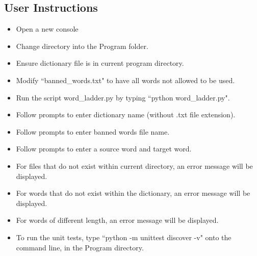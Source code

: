 \documentclass[12pt, a4]{report}
\begin{document}
	\newpage
	\subsection{User Instructions}
		\begin{itemize}
			\item Open a new console 
			\item Change directory into the Program folder.
			\item Ensure dictionary file is in current program directory.
			\item Modify ``banned\_words.txt" to have all words not allowed to be used.  
			\item Run the script word\_ladder.py by typing ``python word\_ladder.py".
			\item Follow prompts to enter dictionary name (without .txt file extension).
			\item Follow prompts to enter banned words file name. 
			\item Follow prompts to enter a source word and target word.
			\item For files that do not exist within current directory, an error message will be displayed.
			\item For words that do not exist within the dictionary, an error message will be displayed. 
			\item For words of different length, an error message will be displayed. 
			\item To run the unit tests, type ``python -m unittest discover -v" onto the command line, in the Program directory. 
		\end{itemize}


	
\end{document}
